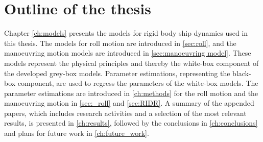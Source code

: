 %

\section{Outline of the thesis}
Chapter \ref{ch:models} presents the models for rigid body ship dynamics used in this thesis. The models for roll motion are introduced in \autoref{sec:roll}, and the manoeuvring motion models are introduced in  \autoref{sec:manoeuvring model}. These models represent the physical principles and thereby the white-box component of the developed grey-box models.
Parameter estimations, representing the black-box component, are used to regress the parameters of the white-box models. The parameter estimations are introduced in \autoref{ch:methods} for the roll motion and the manoeuvring motion in \autoref{sec:_roll} and \autoref{sec:RIDR}. 
A summary of the appended papers, which includes research activities and a selection of the most relevant results, is presented in \autoref{ch:results}, followed by the conclusions in \autoref{ch:conclusions} and plans for future work in \autoref{ch:future_work}.